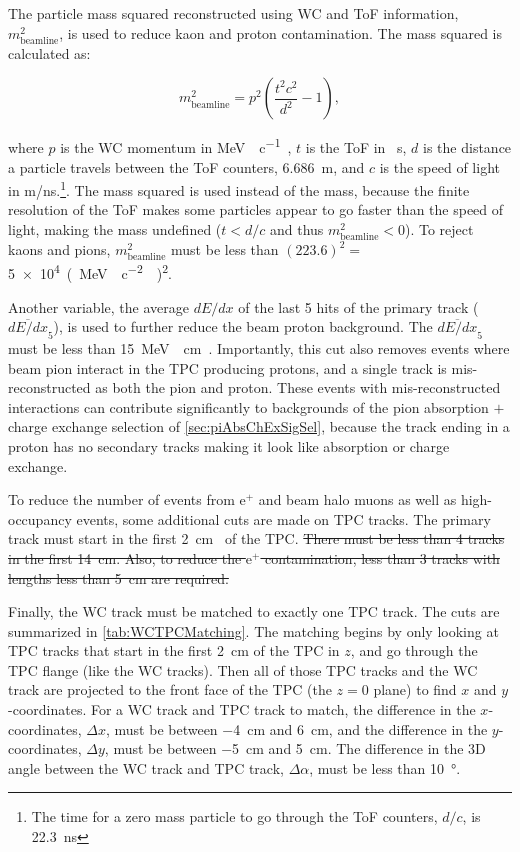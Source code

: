 \documentclass[letterpaper,12pt]{article}
\newcommand{\MeV}{\mega\electronvolt}
\newcommand{\MeVc}{\MeV{}\per c}
\newcommand{\MeVcc}{\MeV{}\per\square c}
\newcommand{\ep}{\ensuremath{\text{e}^{+}}}
\newcommand{\mSqrBeam}{\ensuremath{m^2_{\mathrm{beamline}}}}
\begin{document}
The particle mass squared reconstructed using WC and ToF information,
\mSqrBeam{}, is used to reduce kaon and proton contamination. The mass squared
is calculated as:

\begin{equation}
\mSqrBeam{} = p^2 \left( \frac{t^2 c^2}{d^2} - 1 \right),
\end{equation}

where $p$ is the WC momentum in \si{\MeVc{}}, $t$ is the ToF in \si{\nano
\second}, $d$ is the distance a particle travels between the ToF counters,
\SI{6.686}{\meter}, and $c$ is the speed of light in \si[per-mode =
symbol]{\meter \per \nano \second}.\footnote{The time for a zero mass particle
to go through the ToF counters, $d/c$, is \SI{22.3}{\nano \second}}. The mass
squared is used instead of the mass, because the finite resolution of the ToF
makes some particles appear to go faster than the speed of light, making the
mass undefined ($t < d/c$ and thus $\mSqrBeam{} < 0$). To reject kaons and
pions, \mSqrBeam{} must be less than $(223.6)^2 = $ \SI{5e4}{(\MeVcc{}
)\squared}.

Another variable, the average $dE/dx$ of the last 5 hits of the primary track
($\overline{dE/dx}_5$), is used to further reduce the beam proton background.
The $\overline{dE/dx}_5$ must be less than \SI[per-mode = symbol]{15}{\MeV
\per \cm{}}. Importantly, this cut also removes events where beam pion interact
in the TPC producing protons, and a single track is mis-reconstructed as both
the pion and proton. These events with mis-reconstructed interactions can
contribute significantly to backgrounds of the pion absorption $+$ charge
exchange selection of \cref{sec:piAbsChExSigSel}, because the track ending in a
proton has no secondary tracks making it look like absorption or charge
exchange.

To reduce the number of events from \ep{} and beam halo muons as well as
high-occupancy events, some additional cuts are made on TPC tracks. The primary
track must start in the first \SI{2}{\cm{}} of the TPC. \sout{There must be
less than 4 tracks in the first \SI{14}{\cm}. Also, to reduce the \ep{}
contamination, less than 3 tracks with lengths less than \SI{5}{\cm} are
required.} %

Finally, the WC track must be matched to exactly one TPC track. The cuts are
summarized in \cref{tab:WCTPCMatching}. The matching begins by only looking at
TPC tracks that start in the first \SI{2}{\cm} of the TPC in $z$, and go
through the TPC flange (like the WC tracks). Then all of those TPC tracks and
the WC track are projected to the front face of the TPC (the $z=0$ plane) to
find $x$ and $y$-coordinates. For a WC track and TPC track to match, the
difference in the $x$-coordinates, $\Delta x$, must be between \SI{-4}{\cm} and
\SI{6}{\cm}, and the difference in the $y$-coordinates, $\Delta y$, must be
between \SI{-5}{\cm} and \SI{5}{\cm}. The difference in the 3D angle between
the WC track and TPC track, $\Delta \alpha$, must be less than
\SI{10}{\degree}.
\end{document}
